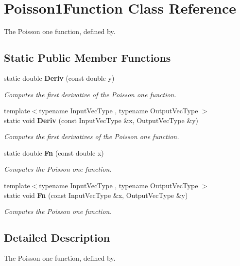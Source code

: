 \section{Poisson1\+Function Class Reference}
\label{classmlpack_1_1ann_1_1Poisson1Function}


The Poisson one function, defined by.  


\subsection*{Static Public Member Functions}
\begin{DoxyCompactItemize}
\item 
static double \textbf{ Deriv} (const double y)
\begin{DoxyCompactList}\small\item\em Computes the first derivative of the Poisson one function. \end{DoxyCompactList}\item 
{\footnotesize template$<$typename Input\+Vec\+Type , typename Output\+Vec\+Type $>$ }\\static void \textbf{ Deriv} (const Input\+Vec\+Type \&x, Output\+Vec\+Type \&y)
\begin{DoxyCompactList}\small\item\em Computes the first derivatives of the Poisson one function. \end{DoxyCompactList}\item 
static double \textbf{ Fn} (const double x)
\begin{DoxyCompactList}\small\item\em Computes the Poisson one function. \end{DoxyCompactList}\item 
{\footnotesize template$<$typename Input\+Vec\+Type , typename Output\+Vec\+Type $>$ }\\static void \textbf{ Fn} (const Input\+Vec\+Type \&x, Output\+Vec\+Type \&y)
\begin{DoxyCompactList}\small\item\em Computes the Poisson one function. \end{DoxyCompactList}\end{DoxyCompactItemize}


\subsection{Detailed Description}
The Poisson one function, defined by. 

